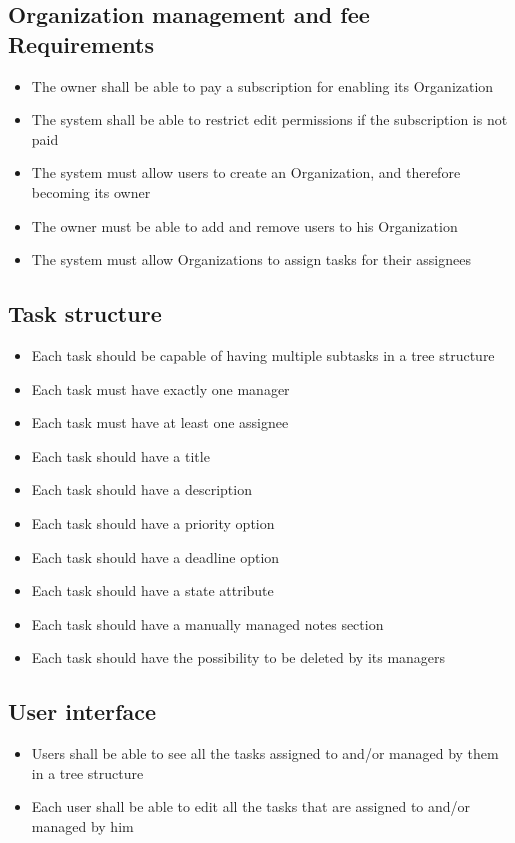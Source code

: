 \documentclass{article}
\begin{document}
\subsection{Organization management and fee Requirements}
\begin{itemize}
    \item The owner shall be able to pay a subscription for enabling its Organization
    \item The system shall be able to restrict edit permissions if the subscription is not paid
    \item The system must allow users to create an Organization, and therefore becoming its owner
    \item The owner must be able to add and remove users to his Organization
    \item The system must allow Organizations to assign tasks for their assignees
\end{itemize}
\subsection{Task structure}
\begin{itemize}
    \item Each task should be capable of having multiple subtasks in a tree structure
    \item Each task must have exactly one manager
    \item Each task must have at least one assignee
    \item Each task should have a title
    \item Each task should have a description
    \item Each task should have a priority option
    \item Each task should have a deadline option
    \item Each task should have a state attribute
    \item Each task should have a manually managed notes section
    \item Each task should have the possibility to be deleted by its managers
\end{itemize}
\subsection{User interface}
\begin{itemize}
    \item Users shall be able to see all the tasks assigned to and/or managed by them in a tree structure
    \item Each user shall be able to edit all the tasks that are assigned to and/or managed by him
\end{itemize}
\end{document}
